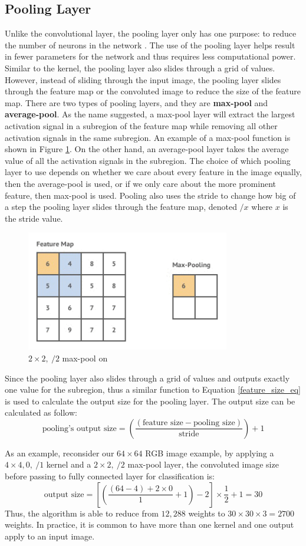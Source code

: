 \subsection{Pooling Layer} \label{subsec:pooling_layer}
Unlike the convolutional layer, the pooling layer only has one purpose: to reduce the number of neurons in the network \cite{o2015introduction}. The use of the pooling layer helps result in fewer parameters for the network and thus requires less computational power. Similar to the kernel, the pooling layer also slides through a grid of values. However, instead of sliding through the input image, the pooling layer slides through the feature map or the convoluted image to reduce the size of the feature map. There are two types of pooling layers, and they are \textbf{max-pool} and \textbf{average-pool}. As the name suggested, a max-pool layer will extract the largest activation signal in a subregion of the feature map while removing all other activation signals in the same subregion. An example of a max-pool function is shown in Figure \ref{fig:max_pool_diagram}. On the other hand, an average-pool layer takes the average value of all the activation signals in the subregion. The choice of which pooling layer to use depends on whether we care about every feature in the image equally, then the average-pool is used, or if we only care about the more prominent feature, then max-pool is used. Pooling also uses the stride to change how big of a step the pooling layer slides through the feature map, denoted $/x$ where $x$ is the stride value.
%
\begin{figure}[!ht]
    \centering
    \includegraphics[width=3.5in]{figures/max_pool.png}
    \caption{$2 \times 2,\ /2$ max-pool on \cite{zeiler2014visualizing}}
    \label{fig:max_pool_diagram}
\end{figure}
%
Since the pooling layer also slides through a grid of values and outputs exactly one value for the subregion, thus a similar function to Equation \ref{feature_size_eq} is used to calculate the output size for the pooling layer. The output size can be calculated as follow:
\[
    \text{pooling's output size} = \left(\frac{(\text{feature size} - \text{pooling size})}{\text{stride}} \right) + 1
\]

As an example, reconsider our $64 \times 64$ RGB image example, by applying a $4 \times 4, 0, \ /1$ kernel and a $2 \times 2,\ /2$ max-pool layer, the convoluted image size before passing to fully connected layer for classification is:
\[
    \text{output size} = \left[ \left( \frac{(64 - 4) + 2 \times 0}{1} + 1 \right) - 2 \right] \times \frac{1}{2} + 1 = 30 
\] 
Thus, the algorithm is able to reduce from $12,288$ weights to $30 \times 30 \times 3 = 2700$ weights. In practice, it is common to have more than one kernel and one output apply to an input image.